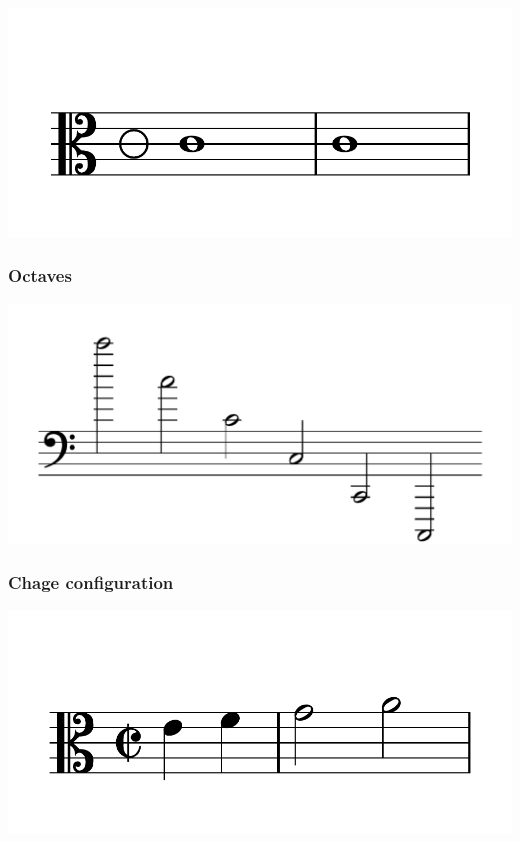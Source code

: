\documentclass{article}
\begin{document}
\includegraphics[scale=0.5]{figures_tests/pdf/skern/timesignature3.pdf}

\subsubsection{Octaves}
\includegraphics[scale=0.5]{figures_tests/pdf/skern/octaves.pdf}

\subsubsection{Chage configuration}
\includegraphics[scale=0.5]{figures_tests/pdf/skern/changeconfiguration.pdf}
\end{document}
